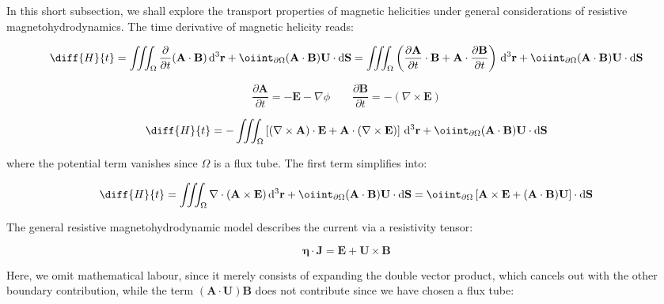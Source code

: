 In this short subsection, we shall explore the transport properties of magnetic helicities under general considerations of resistive magnetohydrodynamics. The time derivative of magnetic helicity reads:

\begin{equation}
    \diff{H}{t}=\iiint_\Omega\frac{\partial}{\partial t}(\mathbf{A}\cdot\mathbf{B})\,\mathrm{d}^3\mathbf{r}+\oiint_{\partial\Omega}(\mathbf{A}\cdot\mathbf{B})\mathbf{U}\cdot\mathrm{d}\mathbf{S}=\iiint_\Omega\left(\frac{\partial\mathbf{A}}{\partial t}\cdot\mathbf{B}+\mathbf{A}\cdot\frac{\partial\mathbf{B}}{\partial t}\right)\,\mathrm{d}^3\mathbf{r}+\oiint_{\partial\Omega}(\mathbf{A}\cdot\mathbf{B})\mathbf{U}\cdot\mathrm{d}\mathbf{S}
\end{equation}

\begin{equation}
    \frac{\partial\mathbf{A}}{\partial t}=-\mathbf{E}-\nabla\phi\qquad\frac{\partial\mathbf{B}}{\partial t}=-(\nabla\times\mathbf{E})
\end{equation}

\begin{equation}
    \diff{H}{t}=-\iiint_\Omega\left[(\nabla\times\mathbf{A})\cdot\mathbf{E}+\mathbf{A}\cdot(\nabla\times\mathbf{E})\right]\,\mathrm{d}^3\mathbf{r}+\oiint_{\partial\Omega}(\mathbf{A}\cdot\mathbf{B})\mathbf{U}\cdot\mathrm{d}\mathbf{S}
\end{equation}

where the potential term vanishes since $\Omega$ is a flux tube. The first term simplifies into:

\begin{equation}
    \diff{H}{t}=\iiint_{\Omega}\nabla\cdot(\mathbf{A}\times\mathbf{E})\,\mathrm{d}^3\mathbf{r}+\oiint_{\partial\Omega}(\mathbf{A}\cdot\mathbf{B})\mathbf{U}\cdot\mathrm{d}\mathbf{S}=\oiint_{\partial\Omega}\left[\mathbf{A}\times\mathbf{E}+(\mathbf{A}\cdot\mathbf{B})\mathbf{U}\right]\cdot\mathrm{d}\mathbf{S}
\end{equation}

The general resistive magnetohydrodynamic model describes the current via a resistivity tensor:

\begin{equation}
    \boldsymbol{\eta}\cdot\mathbf{J}=\mathbf{E}+\mathbf{U}\times\mathbf{B}
\end{equation}

Here, we omit mathematical labour, since it merely consists of expanding the double vector product, which cancels out with the other boundary contribution, while the term $(\mathbf{A}\cdot\mathbf{U})\mathbf{B}$ does not contribute since we have chosen a flux tube:


